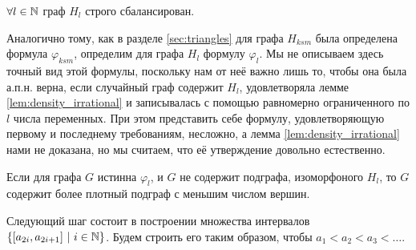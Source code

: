 \begin{Lem}
\label{lem:balanced}
$\forall l \in \mathbb {N} $ граф $H_l$ строго сбалансирован.
\end{Lem}

Аналогично тому, как в разделе \ref{sec:triangles} для графа $H_{ksm}$ была определена формула $\varphi_{ksm}$, определим для графа $H_l$ формулу $\varphi_l$.
Мы не описываем здесь точный вид этой формулы, поскольку нам от неё важно лишь то, чтобы она была а.п.н. верна, если случайный граф содержит $H_l$, удовлетворяла лемме \ref{lem:density_irrational} и записывалась с помощью равномерно ограниченного по $l$ числа переменных. 
При этом представить себе формулу, удовлетворяющую первому и последнему требованиям, несложно, а лемма \ref{lem:density_irrational} нами не доказана, но мы считаем, что её утверждение довольно естественно.

\begin{Lem} 
\label{lem:density_irrational}
Если для графа $G$ истинна $\varphi_l$, и $G$ не содержит подграфа, изоморфоного $H_l$, то $G$ содержит более плотный подграф с меньшим числом вершин.
\end{Lem}



Следующий шаг состоит в построении множества интервалов $\{[a_{2i}, a_{2i+1}] ~ | ~ i \in \mathbb {N} \}$.
Будем строить его таким образом, чтобы $a_1 < a_2 < a_3 < \ldots$.


